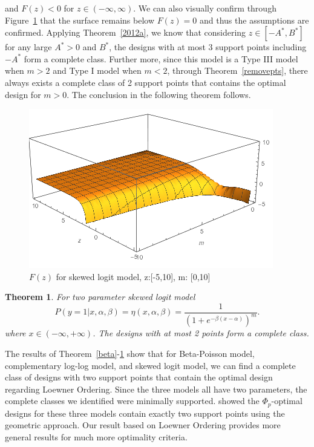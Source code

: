 \documentclass[11pt]{amsart}
\newtheorem{theorem}{Theorem}[section]
\theoremstyle{definition}
\theoremstyle{remark}
\numberwithin{equation}{section}
\begin{document}
     and $F(z)<0$ for $z\in (-\infty,\infty)$. We can also visually confirm through Figure~\ref{fig:skewedlogit_after} that the surface remains below $F(z)=0$ and thus the assumptions are confirmed. Applying Theorem~\ref{2012a}, we know that considering $z\in[-A^*,B^*]$ for any large $A^*>0$ and $B^*$, the designs with at most 3 support points including $-A^*$ form a complete class. Further more, since this model is a Type III model when $m>2$ and Type I model when $m<2$, through Theorem~\ref{removepts}, there always exists a complete class of 2 support points that contains the optimal design for $m>0$. The conclusion in the following theorem follows.
     \begin{figure}[h]
    \centering
    \includegraphics[scale = 0.8]{skewlogit_after_F.png}
    \caption{$F(z)$ for skewed logit model, z:[-5,10], m: [0,10]}
    \label{fig:skewedlogit_after}
\end{figure}
\begin{theorem}\label{skew}
For two parameter skewed logit model\[
P(y=1|x,\alpha,\beta) = \eta(x,\alpha,\beta)= \frac{1}{(1+e^{-\beta(x-\alpha)})^m}.
\]where $x\in (-\infty,+\infty)$. The designs with at most 2 points form a complete class.
\end{theorem}


The results of Theorem~\ref{beta}-\ref{skew} show that for Beta-Poisson model, complementary log-log model, and skewed logit model, we can find a complete class of designs with two support points that contain the optimal design regarding Loewner Ordering. Since the three models all have two parameters, the complete classes we identified were minimally supported. \cite{biedermann2006} showed the $\Phi_p$-optimal designs for these three models contain exactly two support points using the geometric approach. Our result based on Loewner Ordering provides more general results for much more optimality criteria.
\end{document}
